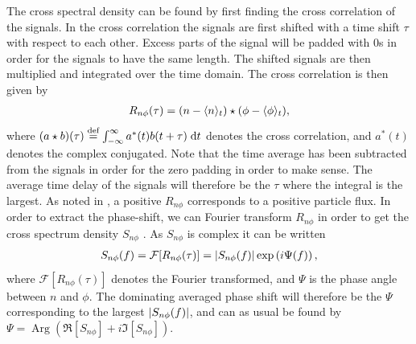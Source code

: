 The cross spectral density can be found by first finding the cross correlation of the signals.
In the cross correlation the signals are first shifted with a time shift $\tau$ with respect to each other.
Excess parts of the signal will be padded with $0$s in order for the signals to have the same length.
The shifted signals are then multiplied and integrated over the time domain.
The cross correlation is then given by
%
\begin{align*}
    R_{n\phi}(\tau) = (n-\langle{n}\rangle_t) \star (\phi-\langle{\phi}\rangle_t),
\end{align*}
%
where $(a \star b)(\tau) \overset{\text{def}}{=} \int_{-\infty }^{\infty} {a^{*}(t) b(t+\tau )} \; \text{d} {t}$ denotes the cross correlation, and $a^*(t)$ denotes the complex conjugated.
Note that the time average has been subtracted from the signals in order for the zero padding in order to make sense.
The average time delay of the signals will therefore be the $\tau$ where the integral is the largest.
As noted in \cite{Huld1988}, a positive $R_{n\phi}$ corresponds to a positive particle flux.
In order to extract the phase-shift, we can Fourier transform $R_{n\phi}$ in order to get the cross spectrum density $S_{n\phi}$ .
As $S_{n\phi}$ is complex it can be written
%
\begin{align*}
    S_{n\phi}(f) = \mathcal{F}[R_{n\phi}(\tau)] = \left|S_{n\phi}(f)\right|\exp\left(i\Psi(f)\right),
\end{align*}
%
where $\mathcal{F}[R_{n\phi}(\tau)]$ denotes the Fourier transformed, and $\Psi$ is the phase angle between $n$ and $\phi$.
The dominating averaged phase shift will therefore be the $\Psi$ corresponding to the largest $\left|S_{n\phi}(f)\right|$, and can as usual be found by $\Psi = \operatorname{Arg}(\Re[S_{n\phi}]+i\Im[S_{n\phi}])$.

